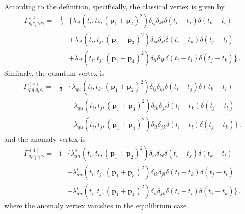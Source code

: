 \documentclass[reprint,english,superscriptaddress,preprintnumbers,amsmath,amssymb,aps,prd]{revtex4-1}
\begin{document}
According to the definition, specifically, the classical vertex is given by 
\begin{align}
    \Gamma_{q_{i}c_{j}c_{k}c_{l}}^{(4)}=-\frac{1}{3}&\Big\{\lambda_{cl}\left(t_i,t_k,\left(\boldsymbol{p}_{1}+\boldsymbol{p}_{2}\right)^{2}\right)\delta_{ij}\delta_{kl}\delta(t_i-t_j)\delta(t_k-t_l)\nonumber\\[2ex]
    &+\lambda_{cl}\left(t_i,t_j,\left(\boldsymbol{p}_{1}+\boldsymbol{p}_{3}\right)^{2}\right)\delta_{ik}\delta_{jl}\delta(t_i-t_k)\delta(t_j-t_l)\nonumber\\[2ex]
    &+\lambda_{cl}\left(t_i,t_j,\left(\boldsymbol{p}_{1}+\boldsymbol{p}_{4}\right)^{2}\right)\delta_{il}\delta_{jk}\delta(t_i-t_l)\delta(t_j-t_k)\Big\}\,.\label{eq:classical-vertex}
\end{align}
Similarly, the quantum vertex is
\begin{align}
    \Gamma_{q_{i}q_{j}q_{k}c_{l}}^{(4)}=-\frac{1}{3}&\Big\{\lambda_{qu}\left(t_i,t_k,\left(\boldsymbol{p}_{1}+\boldsymbol{p}_{2}\right)^{2}\right)\delta_{ij}\delta_{kl}\delta(t_i-t_j)\delta(t_k-t_l)\nonumber\\[2ex]
    &+\lambda_{qu}\left(t_i,t_j,\left(\boldsymbol{p}_{1}+\boldsymbol{p}_{3}\right)^{2}\right)\delta_{ik}\delta_{jl}\delta(t_i-t_k)\delta(t_j-t_l)\nonumber\\[2ex]
    &+\lambda_{qu}\left(t_i,t_j,\left(\boldsymbol{p}_{1}+\boldsymbol{p}_{4}\right)^{2}\right)\delta_{il}\delta_{jk}\delta(t_i-t_l)\delta(t_j-t_k)\Big\}\,.\label{eq:quantum-vertex}
\end{align}
and the anomaly vertex is
\begin{align}
    \Gamma_{q_{i}q_{j}c_{k}c_{l}}^{(4)}=-\mathrm{i}&\Big\{\lambda_{an}^{s}\left(t_i,t_k,\left(\boldsymbol{p}_{1}+\boldsymbol{p}_{2}\right)^{2}\right)\delta_{ij}\delta_{kl}\delta(t_i-t_j)\delta(t_k-t_l)\nonumber\\[2ex]
    &+\lambda_{an}^{t}\left(t_i,t_j,\left(\boldsymbol{p}_{1}+\boldsymbol{p}_{3}\right)^{2}\right)\delta_{ik}\delta_{jl}\delta(t_i-t_k)\delta(t_j-t_l)\nonumber\\[2ex]
    &+\lambda_{an}^{t}\left(t_i,t_j,\left(\boldsymbol{p}_{1}+\boldsymbol{p}_{4}\right)^{2}\right)\delta_{il}\delta_{jk}\delta(t_i-t_l)\delta(t_j-t_k)\Big\}\,.\label{eq:anomaly-vertex}
\end{align}
where the anomaly vertex vanishes in the equilibrium case.
\end{document}
